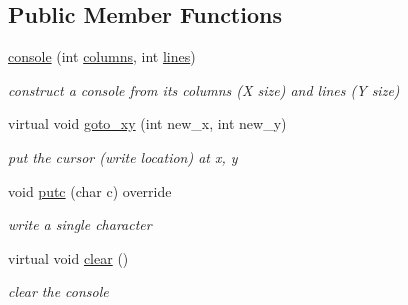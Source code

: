 \subsection*{Public Member Functions}
\begin{DoxyCompactItemize}
\item 
\hyperlink{classhwlib_1_1console_a3a5cf41b86ef577bf7c6eea606dfb7f5}{console} (int \hyperlink{classhwlib_1_1console_a5dbe79428aadd15210029a76cb3d255d}{columns}, int \hyperlink{classhwlib_1_1console_a7c5ec25f5c780aaa56702778701ee270}{lines})\hypertarget{classhwlib_1_1console_a3a5cf41b86ef577bf7c6eea606dfb7f5}{}\label{classhwlib_1_1console_a3a5cf41b86ef577bf7c6eea606dfb7f5}

\begin{DoxyCompactList}\small\item\em construct a console from its columns (X size) and lines (Y size) \end{DoxyCompactList}\item 
virtual void \hyperlink{classhwlib_1_1console_a3a9aa37f895584f4b07baadeb0a8827e}{goto\+\_\+xy} (int new\+\_\+x, int new\+\_\+y)\hypertarget{classhwlib_1_1console_a3a9aa37f895584f4b07baadeb0a8827e}{}\label{classhwlib_1_1console_a3a9aa37f895584f4b07baadeb0a8827e}

\begin{DoxyCompactList}\small\item\em put the cursor (write location) at x, y \end{DoxyCompactList}\item 
void \hyperlink{classhwlib_1_1console_ae265a4538a03a68a0ceadcc5fca153f4}{putc} (char c) override\hypertarget{classhwlib_1_1console_ae265a4538a03a68a0ceadcc5fca153f4}{}\label{classhwlib_1_1console_ae265a4538a03a68a0ceadcc5fca153f4}

\begin{DoxyCompactList}\small\item\em write a single character \end{DoxyCompactList}\item 
virtual void \hyperlink{classhwlib_1_1console_a6cc5c79177e0fa54e8fb0e50e30c1d30}{clear} ()
\begin{DoxyCompactList}\small\item\em clear the console \end{DoxyCompactList}\end{DoxyCompactItemize}
